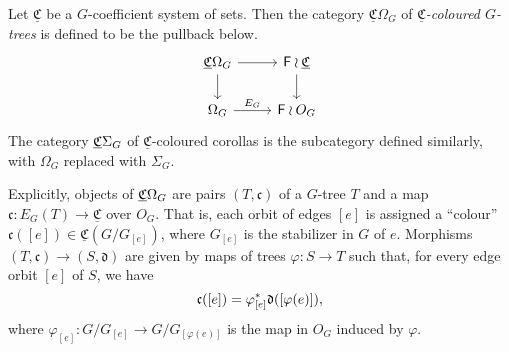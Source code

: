 \documentclass[psamsfonts,onesided,10pt
,draft
]{amsart}%
\renewcommand{\phi}{\varphi}
\begin{document}
\begin{definition}
      Let $\underline{\mathfrak C}$ be a $G$-coefficient system of sets.
      Then the category $\underline{\mathfrak C}\Omega_G$ of \textit{$\underline{\mathfrak C}$-coloured $G$-trees}
      is defined to be the pullback below.
      \begin{equation}
            \label{COMEGA_G_EQ}
            \begin{tikzcd}
                  \CO \arrow[d] \arrow[r]
                  &
                  \mathsf F \wr \underline{\mathfrak C} \arrow[d]
                  \\
                  \Omega_G \arrow[r, "E_G"]
                  &
                  \mathsf F \wr O_G
            \end{tikzcd}
      \end{equation}
      The category $\underline{\mathfrak C} \Sigma_G$ of $\underline{\mathfrak C}$-coloured corollas is the subcategory defined similarly,
      with $\Omega_G$ replaced with $\Sigma_G$.
\end{definition}


Explicitly, objects of $\underline{\mathfrak C} \Omega_G$ are pairs $(T, \mathfrak c)$ of
a $G$-tree $T$ and
a map $\mathfrak c: E_G(T) \to \underline{\mathfrak C}$ over $O_G$.
That is, each orbit of edges $[e]$ is assigned a ``colour'' $\mathfrak c([e]) \in \underline{\mathfrak C}(G/G_{[e]})$,
where $G_{[e]}$ is the stabilizer in $G$ of $e$.
Morphisms $(T, \mathfrak c) \to (S, \mathfrak d)$
are given by maps of trees $\phi: S \to T$ such that, for every edge orbit $[e]$ of $S$, we have
\begin{equation}
      \mathfrak c([e]) = \phi_{[e]}^{\**}\mathfrak d([\phi(e)]),
\end{equation}
where $\phi_{[e]}: G / G_{[e]} \to G / G_{[\phi(e)]}$ is the map in $O_G$ induced by $\phi$.
\end{document}
